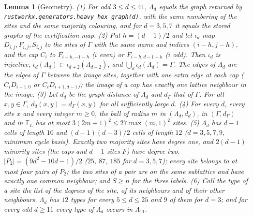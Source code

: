 \documentclass[aps,prx,onecolumn,10pt,nofootinbib,longbibliography,floatfix]{revtex4-2}
\newtheorem{lemma}{Lemma}
\theoremstyle{remark}
\begin{document}
\begin{lemma}[Geometry]
\label{lem:geometry}
(1) For odd $3\le d\le41$, $\Lambda_d$ equals the graph returned by \texttt{rustworkx.\allowbreak generators.\allowbreak heavy\_hex\_graph(d)}, %
with the same numbering of the sites and the same majority colouring, and for $d=3,5,7$ it equals the stored
graphs of the certification map.
(2) Put $h=(d-1)/2$ and let $\iota_d$ map $D_{i,j},F_{i,j},S_{i,j}$ to the sites of $\Gamma$ with the same name and %
indices $(i-h,j-h)$, and the cap $C_i$ to $F_{i-h,-1-h}$ ($i$ even) or $F_{i-h,d-1-h}$ ($i$ odd). Then $\iota_d$ is
injective, $\iota_d(\Lambda_d)\subset\iota_{d+2}(\Lambda_{d+2})$, and $\bigcup_d\iota_d(\Lambda_d)=\Gamma$. The edges of
$\Lambda_d$ are the edges of $\Gamma$ between the image sites, together with one extra edge at each cap
($C_iD_{i+1,0}$ or $C_iD_{i+1,d-1}$); the image of a cap has exactly one lattice neighbour in the image.
(3) Let $d_d$ be the graph distance of $\Lambda_d$ and $d_\Gamma$ that of $\Gamma$. For all $x,y\in\Gamma$, %
$d_d(x,y)=d_\Gamma(x,y)$ for all sufficiently large $d$.
(4) For every $d$, every site $x$ and every integer $m\ge0$, the ball of radius $m$ in $(\Lambda_d,d_d)$, in %
$(\Gamma,d_\Gamma)$ and in $\mathbb T_L$ has at most $3(2m+1)^2\le27\max(m,1)^2$ sites.
(5) $\Lambda_d$ has $d-1$ cells of length $10$ and $(d-1)(d-3)/2$ cells of length $12$ ($d=3,5,7,9$, minimum cycle %
basis). Exactly two majority sites have degree one, and $2(d-1)$ minority sites (the caps and $d-1$ sites $F$) have
degree two. $|P_2|=(9d^2-10d-1)/2$ ($25$, $87$, $185$ for $d=3,5,7$); every site belongs to at most four pairs of %
$P_2$; the two sites of a pair are on the same sublattice and have exactly one common neighbour; and $S\ge n$ for
the three labels.
(6) Call the \emph{type} of a site the list of the degrees of the site, of its neighbours and of their other %
neighbours. $\Lambda_d$ has $12$ types for every $5\le d\le25$ and $9$ of them for $d=3$; and for every odd %
$d\ge11$ every type of $\Lambda_d$ occurs in $\Lambda_{11}$.
\end{lemma}
\end{document}
